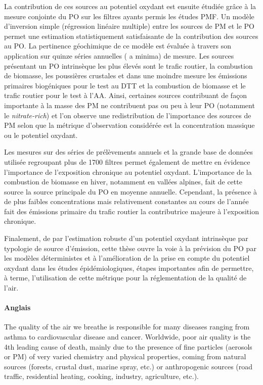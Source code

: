 La contribution de ces sources au potentiel oxydant est ensuite étudiée grâce à la mesure
conjointe du PO sur les filtres ayants permis les études PMF. Un modèle
d'inversion simple (régression linéaire multiple) entre les sources de PM et le PO permet
une estimation statistiquement satisfaisante de la contribution des sources au PO. La
pertinence géochimique de ce modèle est évaluée à travers son application sur quinze séries annuelles (
a minima) de mesure. Les sources présentant un PO intrinsèque les plus élevés sont le trafic routier, la combustion de biomasse, les
poussières crustales et dans une moindre mesure les émissions primaires biogéniques pour
le test au DTT et la combustion de biomasse et le trafic routier pour le test à l'AA.
Ainsi, certaines sources contribuant de façon importante à la masse des PM ne contribuent
pas ou peu à leur PO (notamment le \textit{nitrate-rich}) et l'on observe une redistribution de
l'importance des sources de PM selon que la métrique d'observation considérée est la concentration
massique ou le potentiel oxydant.

Les mesures sur des séries de prélèvements annuels et la grande base de données
utilisée regroupant plus de 1700 filtres permet également de mettre en évidence
l'importance de l'exposition chronique au potentiel oxydant. L'importance de la
combustion de biomasse en hiver, notamment en vallées alpines, fait de cette source la
source principale du PO en moyenne annuelle. Cependant, la présence à de plus faibles
concentrations mais relativement constantes au cours de l'année fait des émissions
primaire du trafic routier la contributrice majeure à l'exposition chronique.

Finalement, de par l'estimation robuste d'un potentiel oxydant intrinsèque par typologie
de source d'émission, cette thèse ouvre la voie à la prévision du PO par les modèles
déterministes et à l'amélioration de la prise en compte du potentiel oxydant dans les
études épidémiologiques, étapes importantes afin de permettre, à terme, l'utilisation de cette métrique pour
la réglementation de la qualité de l'air.

\paragraph{Anglais}%
\label{par:anglais}

The quality of the air we breathe is responsible for many diseases ranging from asthma to
cardiovascular disease and cancer. Worldwide, poor air quality is the 4th leading cause
of death, mainly due to the presence of fine particles (aerosols or
PM) of very varied chemistry and physical properties, coming from natural sources
(forests, crustal dust, marine spray, etc.) or anthropogenic sources (road traffic,
residential heating, cooking, industry, agriculture, etc.).

